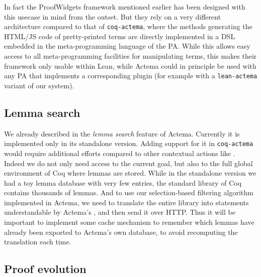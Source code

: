 In fact the ProofWidgets framework mentioned earlier has been designed with this
usecase in mind from the outset. But they rely on a very different architecture
compared to that of \texttt{coq-actema}, where the methods generating the
HTML/JS code of pretty-printed terms are directly implemented in a DSL embedded
in the meta-programming language of the PA. While this allows easy access to all
meta-programming facilities for manipulating terms, this makes their framework
only usable within Lean, while Actema could in principle be used with any PA
that implements a corresponding plugin (for example with a \texttt{lean-actema}
variant of our system).

\subsection{Lemma search}

We already described in  the \emph{lemma search} feature of
Actema. Currently it is implemented only in its standalone version. Adding
support for it in \texttt{coq-actema} would require additional efforts compared
to other contextual actions like . Indeed we do not only need
access to the current goal, but also to the full global environment of Coq where
lemmas are stored. While in the standalone version we had a toy lemma database
with very few entries, the standard library of Coq contains thousands of lemmas.
And to use our selection-based filtering algorithm implemented in Actema, we
need to translate the entire library into statements understandable by Actema's
, and then send it over HTTP. Thus it will be important to
implement some cache mechanism to remember which lemmas have already been
exported to Actema's own database, to avoid recomputing the translation each
time.



\subsection{Proof evolution}

